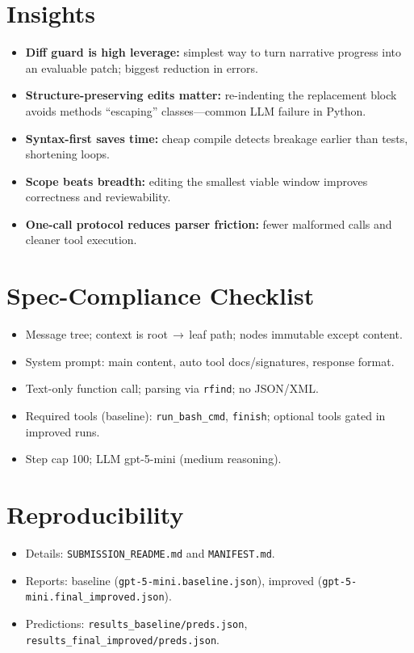 \documentclass[11pt]{article}
\begin{document}
\section*{Insights}
\begin{itemize}
  \item \textbf{Diff guard is high leverage:} simplest way to turn narrative progress into an evaluable patch; biggest reduction in errors.
  \item \textbf{Structure-preserving edits matter:} re-indenting the replacement block avoids methods ``escaping'' classes—common LLM failure in Python.
  \item \textbf{Syntax-first saves time:} cheap compile detects breakage earlier than tests, shortening loops.
  \item \textbf{Scope beats breadth:} editing the smallest viable window improves correctness and reviewability.
  \item \textbf{One-call protocol reduces parser friction:} fewer malformed calls and cleaner tool execution.
\end{itemize}

\section*{Spec-Compliance Checklist}
\begin{itemize}
  \item Message tree; context is root\,$\to$\,leaf path; nodes immutable except content.
  \item System prompt: main content, auto tool docs/signatures, response format.
  \item Text-only function call; parsing via \texttt{rfind}; no JSON/XML.
  \item Required tools (baseline): \texttt{run\_bash\_cmd}, \texttt{finish}; optional tools gated in improved runs.
  \item Step cap 100; LLM gpt-5-mini (medium reasoning).
\end{itemize}

\section*{Reproducibility}
\begin{itemize}
    \item Details: \texttt{SUBMISSION\_README.md} and \texttt{MANIFEST.md}.
    \item Reports: baseline (\texttt{gpt-5-mini.baseline.json}), improved (\texttt{gpt-5-mini.final\_improved.json}).
    \item Predictions: \texttt{results\_baseline/preds.json}, \texttt{results\_final\_improved/preds.json}.
\end{itemize}
\end{document}
